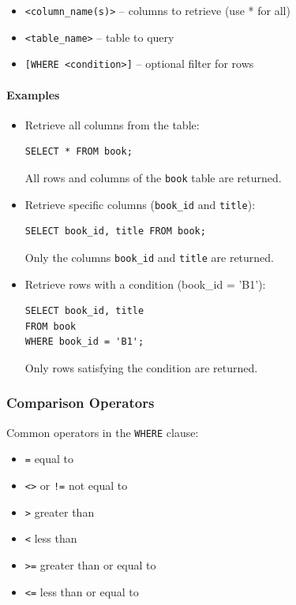 \documentclass{article}
\begin{document}
\begin{itemize}
    \item \texttt{<column\_name(s)>} – columns to retrieve (use * for all)
    \item \texttt{<table\_name>} – table to query
    \item \texttt{[WHERE <condition>]} – optional filter for rows
\end{itemize}
\paragraph{Examples}
\begin{itemize}
    \item Retrieve all columns from the table:  
\begin{verbatim}
SELECT * FROM book;
\end{verbatim}
All rows and columns of the \texttt{book} table are returned.

    \item Retrieve specific columns (\texttt{book\_id} and \texttt{title}):  
\begin{verbatim}
SELECT book_id, title FROM book;
\end{verbatim}
Only the columns \texttt{book\_id} and \texttt{title} are returned.

    \item Retrieve rows with a condition (book\_id = 'B1'):  
\begin{verbatim}
SELECT book_id, title
FROM book
WHERE book_id = 'B1';
\end{verbatim}
Only rows satisfying the condition are returned.
\end{itemize}

\subsubsection{Comparison Operators}
Common operators in the \texttt{WHERE} clause:
\begin{itemize}
    \item \texttt{=} equal to
    \item \texttt{<>} or \texttt{!=} not equal to
    \item \texttt{>} greater than
    \item \texttt{<} less than
    \item \texttt{>=} greater than or equal to
    \item \texttt{<=} less than or equal to
\end{itemize}
\end{document}
